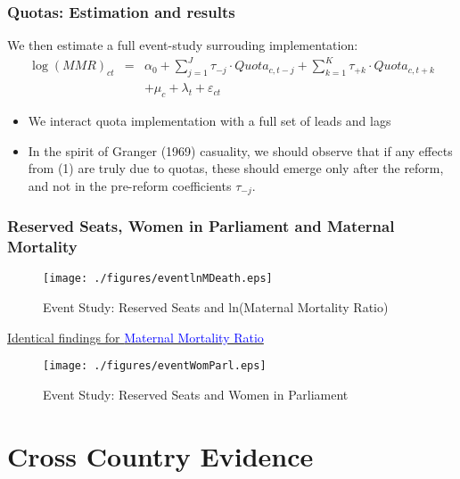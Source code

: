 \documentclass[10pt,letterpaper,subeqn]{beamer}
\begin{document}
\begin{frame}[label=Quotas2]
\frametitle{Quotas: Estimation and results}
We then estimate a full event-study surrouding implementation:
\begin{eqnarray}
  \log(MMR)_{ct} &=& \alpha_0 + \sum_{j=1}^J \tau_{-j}\cdot Quota_{c,t-j} + \sum_{k=1}^K \tau_{+k}\cdot Quota_{c,t+k} \nonumber \\
  && + \mu_c + \lambda_t + \varepsilon_{ct} \nonumber
\end{eqnarray}
\begin{itemize}
\item We interact quota implementation with a full set of leads and lags
\item In the spirit of Granger (1969) casuality, we should observe that if any effects from (1) are truly due to quotas, these should emerge only after the reform, and not in the pre-reform coefficients $\tau_{-j}.$
\end{itemize}
\end{frame}

\begin{frame}[label=quotaTabs]
  \frametitle{Reserved Seats, Women in Parliament and Maternal Mortality}
  
\end{frame}

\begin{frame}[label=quotaMMR]
  \begin{figure}
    \caption{Event Study: Reserved Seats and ln(Maternal Mortality Ratio)}
    \texttt{[image: ./figures/eventlnMDeath.eps]}
  \end{figure}
  \hyperlink{quotalnMMR}{{\footnotesize Identical findings for \textcolor{blue}{Maternal Mortality Ratio}}}
\end{frame}

\begin{frame}[label=quotaWP]
  \begin{figure}
    \caption{Event Study: Reserved Seats and Women in Parliament}
    \texttt{[image: ./figures/eventWomParl.eps]}
  \end{figure}
\end{frame}







\section{Cross Country Evidence}
\end{document}
